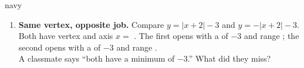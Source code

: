 \documentclass[10pt]{article}
\begin{document}
\begin{scenariobox}{navy}
\begin{enumerate}[leftmargin=1.9em, itemsep=9pt]
  \item \textbf{Same vertex, opposite job.} Compare $y=|x+2|-3$ and $y=-|x+2|-3$. \\[2pt]
    Both have vertex  and axis $x=$ . The first opens 
    with a  of $-3$ and range ; the second opens  with a
     of $-3$ and range . \\[2pt]
    A classmate says ``both have a minimum of $-3$.'' What did they miss?
    \par{}
    \par{}
\end{enumerate}
\end{scenariobox}
\end{document}
